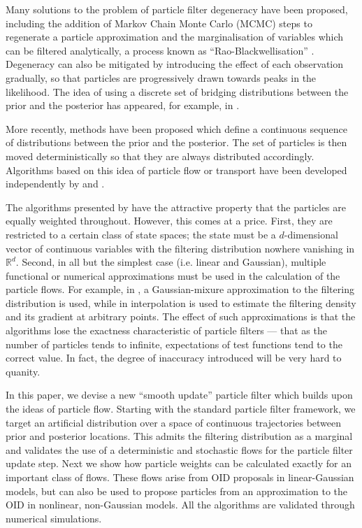 \documentclass{article}
\begin{document}
Many solutions to the problem of particle filter degeneracy have been proposed, including the addition of Markov Chain Monte Carlo (MCMC) steps to regenerate a particle approximation \cite{Gilks2001} and the marginalisation of variables which can be filtered analytically, a process known as ``Rao-Blackwellisation'' \cite{Casella1996,Doucet2000}. Degeneracy can also be mitigated by introducing the effect of each observation gradually, so that particles are progressively drawn towards peaks in the likelihood. The idea of using a discrete set of bridging distributions between the prior and the posterior has appeared, for example, in \cite{Godsill2001b}.

More recently, methods have been proposed which define a continuous sequence of distributions between the prior and the posterior. The set of particles is then moved deterministically so that they are always distributed accordingly. Algorithms based on this idea of particle flow or transport have been developed independently by \cite{Daum2008,Daum2011d} and \cite{Reich2011}.

The algorithms presented by \cite{Daum2008,Daum2011d,Reich2011} have the attractive property that the particles are equally weighted throughout. However, this comes at a price. First, they are restricted to a certain class of state spaces; the state must be a $d$-dimensional vector of continuous variables with the filtering distribution nowhere vanishing in $\mathbb{R}^d$. Second, in all but the simplest case (i.e. linear and Gaussian), multiple functional or numerical approximations must be used in the calculation of the particle flows. For example, in \cite{Reich2011}, a Gaussian-mixure approximation to the filtering distribution is used, while in \cite{Daum2009a} interpolation is used to estimate the filtering density and its gradient at arbitrary points. The effect of such approximations is that the algorithms lose the exactness characteristic of particle filters --- that as the number of particles tends to infinite, expectations of test functions tend to the correct value. In fact, the degree of inaccuracy introduced will be very hard to quanity.

In this paper, we devise a new ``smooth update'' particle filter which builds upon the ideas of particle flow. Starting with the standard particle filter framework, we target an artificial distribution over a space of continuous trajectories between prior and posterior locations. This admits the filtering distribution as a marginal and validates the use of a deterministic and stochastic flows for the particle filter update step. Next we show how particle weights can be calculated exactly for an important class of flows. These flows arise from OID proposals in linear-Gaussian models, but can also be used to propose particles from an approximation to the OID in nonlinear, non-Gaussian models. All the algorithms are validated through numerical simulations.
\end{document}
